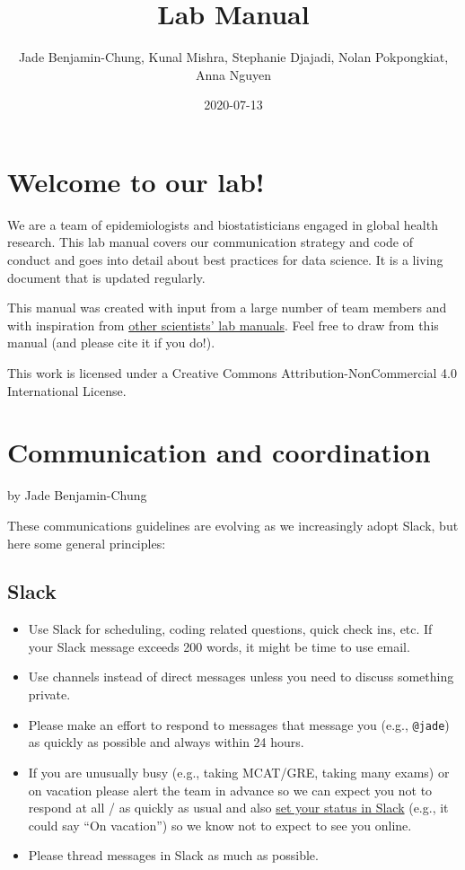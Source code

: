 \documentclass[]{book}
\title{Lab Manual}
\author{Jade Benjamin-Chung, Kunal Mishra, Stephanie Djajadi, Nolan Pokpongkiat,
Anna Nguyen}
\date{2020-07-13}
\providecommand{\tightlist}{%
  \setlength{\itemsep}{0pt}\setlength{\parskip}{0pt}}
\begin{document}
\maketitle

{
\setcounter{tocdepth}{1}
\tableofcontents
}
\chapter{Welcome to our lab!}\label{welcome-to-our-lab}

We are a team of epidemiologists and biostatisticians engaged in global
health research. This lab manual covers our communication strategy and
code of conduct and goes into detail about best practices for data
science. It is a living document that is updated regularly.

This manual was created with input from a large number of team members
and with inspiration from
\href{https://github.com/alylab/labmanual/blob/master/aly-lab-manual.pdf}{other
scientists' lab manuals}. Feel free to draw from this manual (and please
cite it if you do!).

 This work is licensed under a Creative Commons
Attribution-NonCommercial 4.0 International License.

\chapter{Communication and
coordination}\label{communication-and-coordination}

by Jade Benjamin-Chung

These communications guidelines are evolving as we increasingly adopt
Slack, but here some general principles:

\section{Slack}\label{slack}

\begin{itemize}
\tightlist
\item
  Use Slack for scheduling, coding related questions, quick check ins,
  etc. If your Slack message exceeds 200 words, it might be time to use
  email.
\item
  Use channels instead of direct messages unless you need to discuss
  something private.
\item
  Please make an effort to respond to messages that message you (e.g.,
  \texttt{@jade}) as quickly as possible and always within 24 hours.
\item
  If you are unusually busy (e.g., taking MCAT/GRE, taking many exams)
  or on vacation please alert the team in advance so we can expect you
  not to respond at all / as quickly as usual and also
  \href{https://get.slack.help/hc/en-us/articles/201864558-Set-your-Slack-status-and-availability}{set
  your status in Slack} (e.g., it could say ``On vacation'') so we know
  not to expect to see you online.
\item
  Please thread messages in Slack as much as possible.
\end{itemize}
\end{document}
